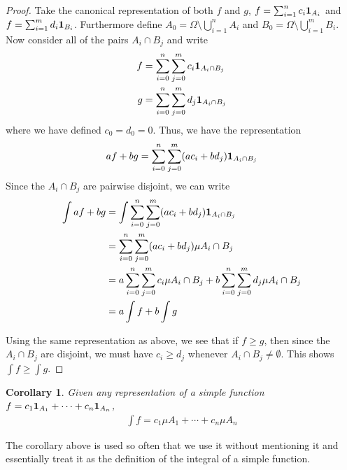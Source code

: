 \documentclass{amsart}
\newtheorem{cor}[thm]{Corollary}
\theoremstyle{remark}
\theoremstyle{definition}
\begin{document}
\begin{proof}Take the canonical representation of both $f$ and $g$, $f
  = \sum_{i=1}^n c_i \textbf{1}_{A_i}$ and $f
  = \sum_{i=1}^m d_i \textbf{1}_{B_i}$.   Furthermore define $A_0 =
  \Omega \setminus \bigcup_{i=1}^n A_i$ and $B_0 =
  \Omega \setminus \bigcup_{i=1}^m B_i$.  Now consider all of the
  pairs $A_i \cap B_j$ and write 
\begin{align*}
f &= \sum_{i=0}^n \sum_{j=0}^m c_i
  \textbf{1}_{A_i \cap B_j} \\
g &= \sum_{i=0}^n \sum_{j=0}^m d_j
  \textbf{1}_{A_i \cap B_j}
\end{align*}
 where we have defined $c_0=d_0=0$.  Thus, we have the  representation 
\begin{align*}
af + bg = \sum_{i=0}^n \sum_{j=0}^m (ac_i + bd_j)   \textbf{1}_{A_i \cap
  B_j}
\end{align*}
Since the $A_i  \cap B_j$ are pairwise disjoint, we can write
\begin{align*}
\int af+bg &= \int \sum_{i=0}^n \sum_{j=0}^m (ac_i + bd_j)   \textbf{1}_{A_i \cap B_j} \\
&= \sum_{i=0}^n \sum_{j=0}^m (ac_i + bd_j)   \mu A_i \cap B_j \\
&= a \sum_{i=0}^n \sum_{j=0}^m c_i  \mu A_i \cap B_j + b \sum_{i=0}^n
\sum_{j=0}^m d_j  \mu A_i \cap B_j \\
&= a \int f + b \int g
\end{align*}

Using the same representation as above, we see that if $f \geq g$,
then since the $A_i \cap B_j$ are disjoint, we must have $c_i \geq
d_j$ whenever $A_i \cap B_j \neq \emptyset$.  This shows $\int f \geq
\int g$.
\end{proof}
\begin{cor}Given any representation of a simple function $f =
c_1 \textbf{1}_{A_1} + \cdots + c_n \textbf{1}_{A_n}$,
\begin{align*}
\int f  = c_1 \mu A_1 + \cdots + c_n \mu A_n
\end{align*} 
\end{cor}
The corollary above is used so often that we use it without mentioning
it and essentially treat it as the definition of the integral of a
simple function.
\end{document}
